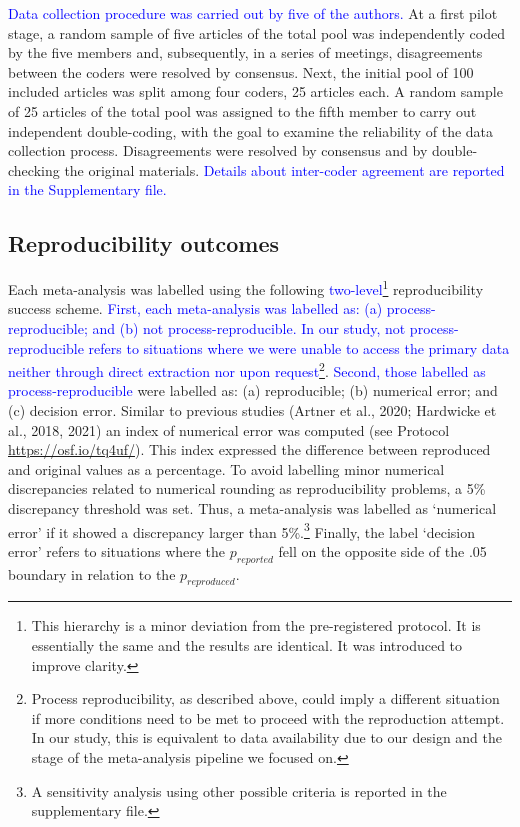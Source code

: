 \documentclass[
  ,man,floatsintext]{apa6}
\begin{document}
\textcolor{blue}{Data collection procedure was carried out by five of the authors.} At a first pilot stage, a random sample of five articles of the total pool was independently coded by the five members and, subsequently, in a series of meetings, disagreements between the coders were resolved by consensus. Next, the initial pool of 100 included articles was split among four coders, 25 articles each. A random sample of 25 articles of the total pool was assigned to the fifth member to carry out independent double-coding, with the goal to examine the reliability of the data collection process. Disagreements were resolved by consensus and by double-checking the original materials. \textcolor{blue}{Details about inter-coder agreement are reported in the Supplementary file.}

\hypertarget{reproducibility-outcomes}{%
\subsection{Reproducibility outcomes}\label{reproducibility-outcomes}}

Each meta-analysis was labelled using the following \textcolor{blue}{two-level}\footnote{This hierarchy is a minor deviation from the pre-registered protocol. It is essentially the same and the results are identical. It was introduced to improve clarity.} reproducibility success scheme. \textcolor{blue}{First, each meta-analysis was labelled as: (a) process-reproducible; and (b) not process-reproducible. In our study, not process-reproducible refers to situations where we were unable to access the primary data neither through direct extraction nor upon request}\footnote{Process reproducibility, as described above, could imply a different situation if more conditions need to be met to proceed with the reproduction attempt. In our study, this is equivalent to data availability due to our design and the stage of the meta-analysis pipeline we focused on.}. \textcolor{blue}{Second, those labelled as process-reproducible} were labelled as: (a) reproducible; (b) numerical error; and (c) decision error. Similar to previous studies (Artner et al., 2020; Hardwicke et al., 2018, 2021) an index of numerical error was computed (see Protocol \url{https://osf.io/tq4uf/}). This index expressed the difference between reproduced and original values as a percentage. To avoid labelling minor numerical discrepancies related to numerical rounding as reproducibility problems, a 5\% discrepancy threshold was set. Thus, a meta-analysis was labelled as `numerical error' if it showed a discrepancy larger than 5\%.\footnote{A sensitivity analysis using other possible criteria is reported in the supplementary file.}
Finally, the label `decision error' refers to situations where the \(p_{reported}\) fell on the opposite side of the .05 boundary in relation to the \(p_{reproduced}\).
\end{document}
